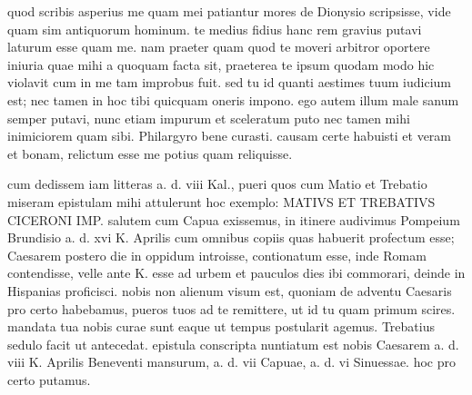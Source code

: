  quod scribis asperius me quam mei patiantur mores de Dionysio scripsisse, vide quam sim antiquorum hominum. te medius fidius hanc rem gravius putavi laturum esse quam me. nam praeter quam quod te moveri arbitror oportere iniuria quae mihi a quoquam facta sit, praeterea te ipsum quodam modo hic violavit cum in me tam improbus fuit. sed tu id quanti aestimes tuum iudicium est; nec tamen in hoc tibi quicquam oneris impono. ego autem illum male sanum semper putavi, nunc etiam impurum et sceleratum puto nec tamen mihi inimiciorem quam sibi. Philargyro bene curasti. causam certe habuisti et veram et bonam, relictum esse me potius quam reliquisse.

 cum dedissem iam litteras a. d. viii Kal., pueri quos cum Matio et Trebatio miseram epistulam mihi attulerunt hoc exemplo: MATIVS ET TREBATIVS CICERONI IMP. salutem cum Capua exissemus, in itinere audivimus Pompeium Brundisio a. d. xvi K. Aprilis cum omnibus copiis quas habuerit profectum esse; Caesarem postero die in oppidum introisse, contionatum esse, inde Romam contendisse, velle ante K. esse ad urbem et pauculos dies ibi commorari, deinde in Hispanias proficisci. nobis non alienum visum est, quoniam de adventu Caesaris pro certo habebamus, pueros tuos ad te remittere, ut id tu quam primum scires. mandata tua nobis curae sunt eaque ut tempus postularit agemus. Trebatius sedulo facit ut antecedat. epistula conscripta nuntiatum est nobis Caesarem a. d. viii K. Aprilis Beneventi mansurum, a. d. vii Capuae, a. d. vi Sinuessae. hoc pro certo putamus.
